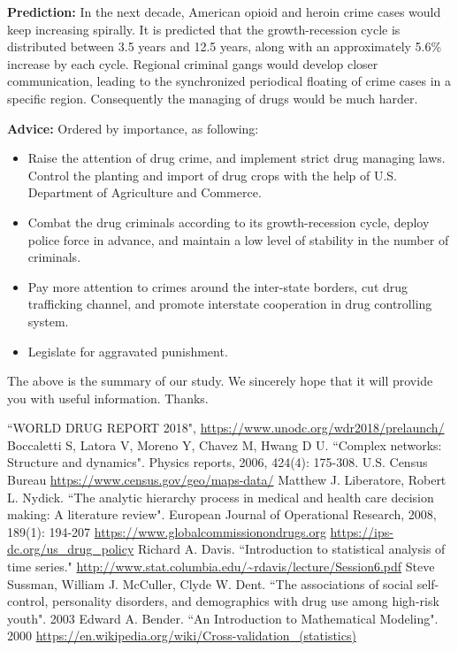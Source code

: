 \documentclass{mcmthesis}
\begin{document}
\textbf{Prediction:} In the next decade, American opioid and heroin crime cases would keep increasing spirally. It is predicted that the growth-recession cycle is distributed between 3.5 years and 12.5 years, along with an approximately 5.6\% increase by each cycle. Regional criminal gangs would develop closer communication, leading to the synchronized periodical floating of crime cases in a specific region. Consequently the managing of drugs would be much harder.

\textbf{Advice:} Ordered by importance, as following:
\begin{itemize}
	\item Raise the attention of drug crime, and implement strict drug managing laws. Control the planting and import of drug crops with the help of U.S. Department of Agriculture and Commerce.
	\item Combat the drug criminals according to its growth-recession cycle, deploy police force in advance, and maintain a low level of stability in the number of criminals.
	\item Pay more attention to crimes around the inter-state borders, cut drug trafficking channel, and promote interstate cooperation in drug controlling system.
	\item Legislate for aggravated punishment.
\end{itemize}

The above is the summary of our study. We sincerely hope that it will provide you with
useful information. Thanks.

\newpage
\begin{thebibliography}{99}
	 ``WORLD DRUG REPORT 2018", \url{https://www.unodc.org/wdr2018/prelaunch/}
	 Boccaletti S, Latora V, Moreno Y, Chavez M, Hwang D U. ``Complex networks: Structure and dynamics". Physics reports, 2006, 424(4): 175-308.
	 U.S. Census Bureau  \url{https://www.census.gov/geo/maps-data/}
	 Matthew J. Liberatore, Robert L. Nydick. ``The analytic hierarchy process in medical and health care decision making: A literature review". European Journal of Operational Research, 2008, 189(1): 194-207
	 \url{https://www.globalcommissionondrugs.org}
	 \url{https://ips-dc.org/us_drug_policy}
	 Richard A. Davis. ``Introduction to statistical analysis of time series." \url{http://www.stat.columbia.edu/~rdavis/lecture/Session6.pdf}
	 Steve Sussman, William J. McCuller, Clyde W. Dent. ``The associations of social self-control, personality disorders, and demographics with drug use among high-risk youth". 2003
	 Edward A. Bender. ``An Introduction to Mathematical Modeling". 2000
	 \url{https://en.wikipedia.org/wiki/Cross-validation_(statistics)}
\end{thebibliography}
\end{document}
